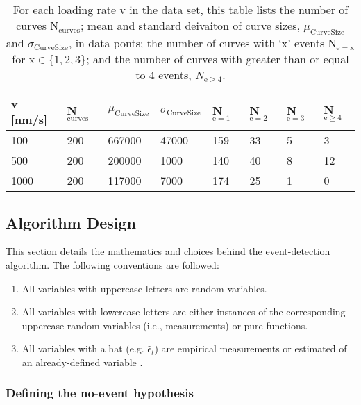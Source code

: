 \documentclass[%
  aip,12pt,tightenlines,
  amsthm,
 amsmath,amssymb
]{article}
\newcommand{\tLabel}[1]{\label{table:#1}}
\begin{document}
\begin{table}
\begin{tabularx}{\textwidth}{ l | l | l | l |l |l|l|l }
\hline \hline
v [nm/s] & N$_\mathrm{curves}$ & $\mu_{\mathrm{Curve Size}}$ & $\sigma_{\mathrm{Curve Size}}$ & N$_{\mathrm{e}= 1}$ & N$_{\mathrm{e}= 2}$ & N$_{\mathrm{e}= 3}$ & N$_{\mathrm{e}\ge4}$  \\ \hline
100 & 200 & 667000 & 47000 & 159 & 33 & 5 & 3  \\ \hline
500 & 200 & 200000 & 1000 & 140 & 40 & 8 & 12  \\ \hline
1000 & 200 & 117000 & 7000 & 174 & 25 & 1 & 0  \\ \hline
\end{tabularx}
\caption[Data set statistical information]{\tLabel{statistics} For each loading rate v in the data set, this table lists the number of curves N$_{\mathrm{curves}}$; mean and standard deivaiton of curve sizes, $\mu_{\mathrm{Curve Size}}$ and $\sigma_{\mathrm{Curve Size}}$, in data ponts; the number of curves with `x' events N$_{\mathrm{e=x}}$ for x$\in\{1,2,3\}$; and the number of curves with greater than or equal to 4 events, $N_{\mathrm{e}\ge4}$. }
\end{table}



\subsection{Algorithm Design}

This section details the mathematics and choices behind the event-detection algorithm. The following conventions are followed:

\begin{enumerate}
 \item All variables with uppercase letters are random variables.
 \item All variables with lowercase letters are either instances of the corresponding uppercase random variables (i.e., measurements) or pure functions.
 \item All variables with a hat (e.g. $\hat{\epsilon}_t$) are empirical measurements or estimated of an already-defined variable .
\end{enumerate}

\subsubsection{Defining the no-event hypothesis}
\end{document}

